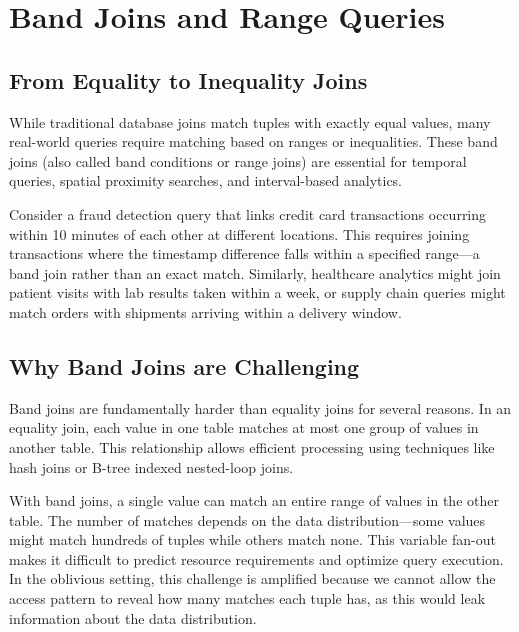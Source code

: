 \section{Band Joins and Range Queries}

\subsection{From Equality to Inequality Joins}

While traditional database joins match tuples with exactly equal values, many real-world queries require matching based on ranges or inequalities. These band joins (also called band conditions or range joins) are essential for temporal queries, spatial proximity searches, and interval-based analytics.

Consider a fraud detection query that links credit card transactions occurring within 10 minutes of each other at different locations. This requires joining transactions where the timestamp difference falls within a specified range---a band join rather than an exact match. Similarly, healthcare analytics might join patient visits with lab results taken within a week, or supply chain queries might match orders with shipments arriving within a delivery window.

\subsection{Why Band Joins are Challenging}

Band joins are fundamentally harder than equality joins for several reasons. In an equality join, each value in one table matches at most one group of values in another table. This relationship allows efficient processing using techniques like hash joins or B-tree indexed nested-loop joins.

With band joins, a single value can match an entire range of values in the other table. The number of matches depends on the data distribution---some values might match hundreds of tuples while others match none. This variable fan-out makes it difficult to predict resource requirements and optimize query execution. In the oblivious setting, this challenge is amplified because we cannot allow the access pattern to reveal how many matches each tuple has, as this would leak information about the data distribution.

